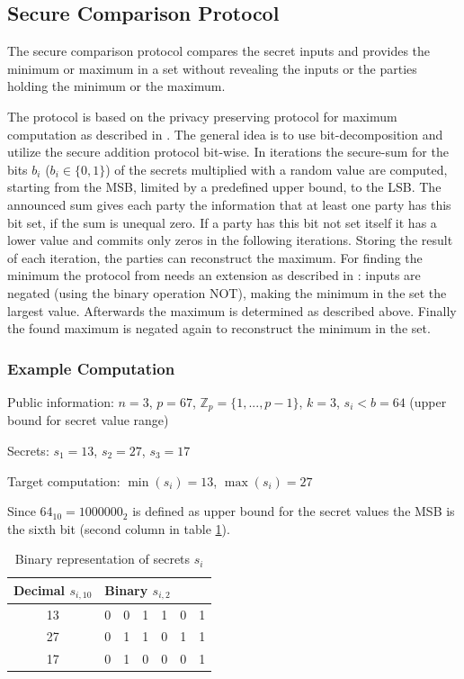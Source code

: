\subsection{Secure Comparison Protocol}	\label{Secure Comparison Protocol}
The secure comparison protocol compares the secret inputs and provides the minimum or maximum in a set without revealing the inputs or the parties holding the minimum or the maximum.

The protocol is based on the privacy preserving protocol for maximum computation as described in \textcite{Hasan2013}. The general idea is to use bit-decomposition and utilize the secure addition protocol bit-wise. In iterations the secure-sum for the bits $b_i$ ($b_i \in \{0,1\}$) of the secrets multiplied with a random value are computed, starting from the \gls{MSB}, limited by a predefined upper bound, to the \gls{LSB}. The announced sum gives each party the information that at least one party has this bit set, if the sum is unequal zero. If a party has this bit not set itself it has a lower value and commits only zeros in the following iterations. Storing the result of each iteration, the parties can reconstruct the maximum.
For finding the minimum the protocol from \textcite{Hasan2013} needs an extension as described in : inputs are negated (using the binary operation NOT), making the minimum in the set the largest value. Afterwards the maximum is determined as described above. Finally the found maximum is negated again to reconstruct the minimum in the set.

\subsubsection{Example Computation} \label{Secure Comparison Example}

Public information: $n=3$, $p=67$, $\mathbb{Z}_p=\{1,...,p-1\}$, $k=3$, $s_i<b=64$ (upper bound for secret value range) \par
\noindent Secrets: $s_1=13$, $s_2=27$, $s_3=17$ \par

\noindent Target computation: $\min(s_i)=13$, $\max(s_i)=27$

Since $64_{10}=1000000_2$ is defined as upper bound for the secret values the \gls{MSB} is the sixth bit (second column in table \ref{table:secure maximum binary representation of secrets}).

\begin{table}[!htb]
	\centering
	\caption{Binary representation of secrets $s_i$} \label{table:secure maximum binary representation of secrets}
	\begin{tabular}{|c|l|l|l|l|l|l|}
		\hline
		Decimal $s_{i,10}$ & \multicolumn{6}{l|}{Binary $s_{i,2}$} \\ \hline
		13                 & 0    & 0    & 1    & 1    & 0   & 1   \\ \hline
		27                 & 0    & 1    & 1    & 0    & 1   & 1   \\ \hline
		17                 & 0    & 1    & 0    & 0    & 0   & 1   \\ \hline
	\end{tabular}
\end{table}

